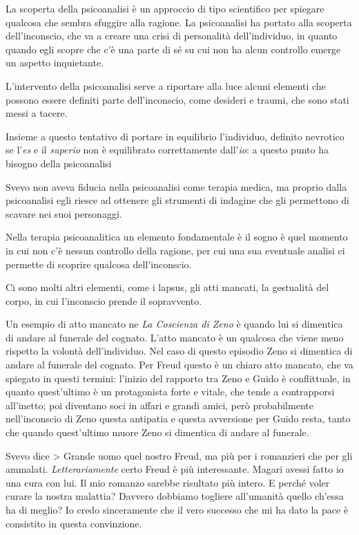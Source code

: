 La scoperta della psicoanalisi è un approccio di tipo scientifico per spiegare qualcosa che sembra sfuggire alla ragione. La psicoanalisi ha portato alla scoperta dell'inconscio, che va a creare una crisi di personalità dell'individuo, in quanto quando egli scopre che c'è una parte di sé su cui non ha alcun controllo emerge un aspetto inquietante.

L'intervento della psicoanalisi serve a riportare alla luce alcuni elementi che possono essere definiti parte dell'inconscio, come desideri e traumi, che sono stati messi a tacere.

Insieme a questo tentativo di portare in equilibrio l'individuo, definito nevrotico se l'\textit{es} e il \textit{superio} non è equilibrato correttamente dall'\textit{io}: a questo punto ha bisogno della psicoanalisi

Svevo non aveva fiducia nella psicoanalisi come terapia medica, ma proprio dalla psicoanalisi egli riesce ad ottenere gli strumenti di indagine che gli permettono di scavare nei suoi personaggi.

Nella terapia psicoanalitica un elemento fondamentale è il sogno è quel momento in cui non c'è nessun controllo della ragione, per cui una sua eventuale analisi ci permette di scoprire qualcosa dell'inconscio.

Ci sono molti altri elementi, come i lapsus, gli atti mancati, la gestualità del corpo, in cui l'inconscio prende il sopravvento.

Un esempio di atto mancato ne \textit{La Coscienza di Zeno} è quando lui si dimentica di andare al funerale del cognato.
L'atto mancato è un qualcosa che viene meno rispetto la volontà dell'individuo. Nel caso di questo episodio Zeno si dimentica di andare al funerale del cognato. Per Freud questo è un chiaro atto mancato, che va spiegato in questi termini: l'inizio del rapporto tra Zeno e Guido è conflittuale, in quanto quest'ultimo è un protagonista forte e vitale, che tende a contrapporsi all'inetto; poi diventano soci in affari e grandi amici, però probabilmente nell'inconscio di Zeno questa antipatia e questa avversione per Guido resta, tanto che quando quest'ultimo muore Zeno si dimentica di andare al funerale.

Svevo dice
> Grande uomo quel nostro Freud, ma più per i romanzieri che per gli ammalati. \textit{Letterariamente} certo Freud è più interessante. Magari avessi fatto io una cura con lui. Il mio romanzo sarebbe risultato più intero. E perché voler curare la nostra malattia? Davvero dobbiamo togliere all'umanità quello ch'essa ha di meglio? Io credo sinceramente che il vero successo che mi ha dato la pace è consistito in questa convinzione.

